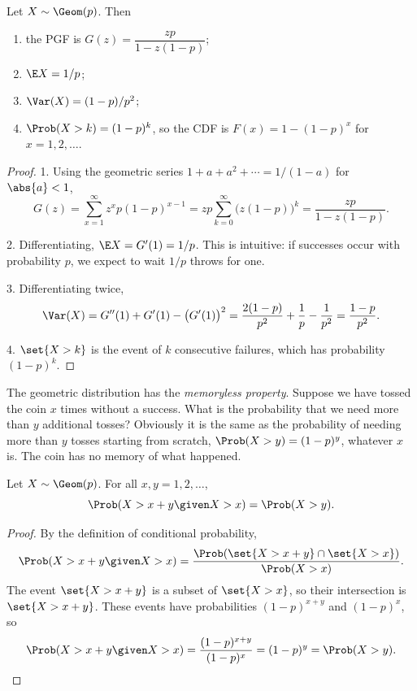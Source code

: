 \begin{theorem}\label{thm:geometric-properties}
Let $X \sim \Geom(p)$. Then
\begin{enumerate}
  \item the PGF is $G(z) = \dfrac{zp}{1 - z(1-p)}$;
  \item $\E X = 1/p$;
  \item $\Var(X) = (1-p)/p^2$;
  \item $\Prob(X > k) = (1-p)^k$, so the CDF is $F(x) = 1 - (1 - p)^x$ for $x = 1, 2, \ldots$.
\end{enumerate}
\end{theorem}

\begin{proof}
1. Using the geometric series $1 + a + a^2 + \cdots = 1/(1-a)$ for $\abs{a} < 1$,
\[
  G(z) = \sum_{x=1}^\infty z^x p (1-p)^{x-1} = zp \sum_{k=0}^\infty \bigl(z(1-p)\bigr)^k = \frac{zp}{1 - z(1-p)}.
\]

2. Differentiating, $\E X = G'(1) = 1/p$. This is intuitive: if successes occur with probability $p$, we expect to wait $1/p$ throws for one.

3. Differentiating twice,
\[
  \Var(X) = G''(1) + G'(1) - \bigl(G'(1)\bigr)^2 = \frac{2(1-p)}{p^2} + \frac1p - \frac{1}{p^2} = \frac{1-p}{p^2}.
\]

4. $\set{X > k}$ is the event of $k$ consecutive failures, which has probability $(1-p)^k$.
\end{proof}

The geometric distribution has the \emph{memoryless property}. Suppose we have tossed the coin $x$ times without a success. What is the probability that we need more than $y$ additional tosses? Obviously it is the same as the probability of needing more than $y$ tosses starting from scratch, $\Prob(X > y) = (1-p)^y$, whatever $x$ is. The coin has no memory of what happened.

\begin{theorem}\label{thm:geometric-memoryless}
Let $X \sim \Geom(p)$. For all $x, y = 1, 2, \ldots$,
\[
  \Prob(X > x + y \given X > x) = \Prob(X > y).
\]
\end{theorem}

\begin{proof}
By the definition of conditional probability,
\[
  \Prob(X > x + y \given X > x) = \frac{\Prob(\set{X > x + y} \cap \set{X > x})}{\Prob(X > x)}.
\]
The event $\set{X > x + y}$ is a subset of $\set{X > x}$, so their intersection is $\set{X > x + y}$. These events have probabilities $(1-p)^{x+y}$ and $(1-p)^x$, so
\[
  \Prob(X > x + y \given X > x) = \frac{(1-p)^{x+y}}{(1-p)^x} = (1-p)^y = \Prob(X > y). \qedhere
\]
\end{proof}

